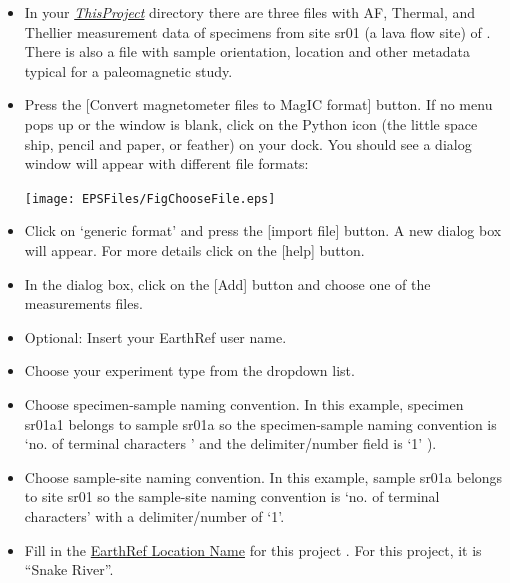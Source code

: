 \documentclass[11pt]{book}
\begin{document}
{{\begin{itemize}
\texttt{[image: EPSFiles/FigGenericFormat.eps]}

To learn what all the column headers mean look at the documentation for \href{#generic_magic.py}{generic\_magic.py}.

%


\item In your  \href{#Project_Directory}{\it ThisProject} directory  there are three files with AF, Thermal, and Thellier measurement data of specimens from site sr01 (a lava flow site) of \cite{tauxe04b}.  There is also a file with sample orientation, location and other metadata typical for a paleomagnetic study.
\item Press the [Convert magnetometer files to MagIC format] button. If no menu pops up or the window is blank, click on the Python icon  (the little space ship, pencil and paper, or feather) on your dock. You should see a dialog window will appear with different file formats:

\texttt{[image: EPSFiles/FigChooseFile.eps]}

\item  Click on  `generic format'  and press the  [import file] button.  A new dialog box will appear. For more details click on the [help] button.
\item  In the dialog box, click on the [Add] button and choose one of the measurements files.
\item  Optional: Insert your EarthRef user name.
\item Choose your experiment type from the dropdown list.

\item Choose specimen-sample naming convention.  In this example, specimen sr01a1 belongs to sample sr01a so the specimen-sample naming convention is  `no. of terminal characters ' and the delimiter/number field is `1' ).
\item Choose sample-site naming convention.  In this example, sample sr01a belongs to site sr01 so the sample-site naming convention is  `no. of terminal characters' with a delimiter/number of  `1'.
\item  Fill in the \href{#MagICDatabase}{EarthRef Location Name}  for this project .  For this project, it is ``Snake River''.


\end{itemize}}}
\end{document}
